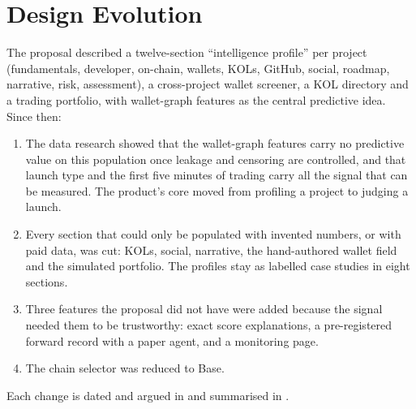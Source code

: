 \section{Design Evolution}
\label{sec:evolution}
The proposal described a twelve-section ``intelligence profile'' per project (fundamentals, developer, on-chain, wallets, KOLs, GitHub, social, roadmap, narrative, risk, assessment), a cross-project wallet screener, a KOL directory and a trading portfolio, with wallet-graph features as the central predictive idea. Since then:
\begin{enumerate}
  \item The data research showed that the wallet-graph features carry no predictive value on this population once leakage and censoring are controlled, and that launch type and the first five minutes of trading carry all the signal that can be measured. The product's core moved from profiling a project to judging a launch.
  \item Every section that could only be populated with invented numbers, or with paid data, was cut: KOLs, social, narrative, the hand-authored wallet field and the simulated portfolio. The profiles stay as labelled case studies in eight sections.
  \item Three features the proposal did not have were added because the signal needed them to be trustworthy: exact score explanations, a pre-registered forward record with a paper agent, and a monitoring page.
  \item The chain selector was reduced to Base.
\end{enumerate}
Each change is dated and argued in  and summarised in .

